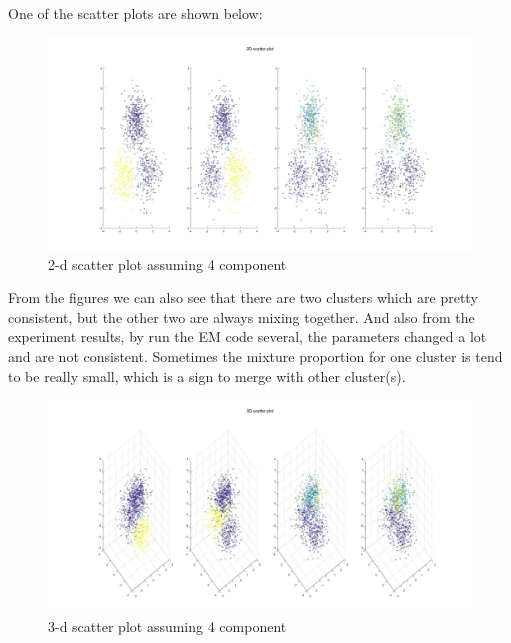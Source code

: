 \documentclass[a4paper]{article}
\begin{document}
\begin{spacing}{2.0}
\begin{enumerate}[(1)]
One of the scatter plots are shown below:
\begin{figure}[H]
\centering
\includegraphics[width = 6in]{scatter2d4.jpg}
\caption{2-d scatter plot assuming 4 component}
\end{figure}
From the figures we can also see that there are two clusters which are pretty consistent, but the other two are always mixing together. And also from the experiment results, by run the EM code several, the parameters changed a lot and are not consistent. Sometimes the mixture proportion for one cluster is tend to be really small, which is a sign to merge with other cluster(s).
\begin{figure}[H]
\centering
\includegraphics[width = 6in]{scatter3d4.jpg}
\caption{3-d scatter plot assuming 4 component}
\end{figure}



\end{enumerate}
\end{spacing}
\end{document}
